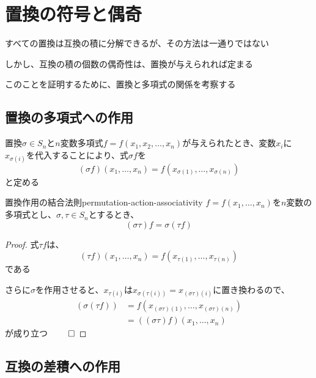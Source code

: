 \documentclass[../../../topic_linear-algebra]{subfiles}
\begin{document}
\sectionline
\section{置換の符号と偶奇}

すべての置換は互換の積に分解できるが、その方法は一通りではない

しかし、互換の積の個数の偶奇性は、置換が与えられれば定まる

\br

このことを証明するために、置換と多項式の関係を考察する

\subsection{置換の多項式への作用}

置換$\sigma \in S_n$と$n$変数多項式$f = f(x_1, x_2, \ldots, x_n)$が与えられたとき、変数$x_i$に$x_{\sigma(i)}$を代入することにより、式$\sigma f$を
\begin{equation*}
  (\sigma f)(x_1, \ldots, x_n) = f(x_{\sigma(1)}, \ldots, x_{\sigma(n)})
\end{equation*}
と定める

\begin{theorem}{置換作用の結合法則}{permutation-action-associativity}
  $f = f(x_1,\ldots,x_n)$を$n$変数の多項式とし、$\sigma, \tau \in S_n$とするとき、
  \begin{equation*}
    (\sigma \tau) f = \sigma (\tau f)
  \end{equation*}
\end{theorem}

\begin{proof}
  式$\tau f$は、
  \begin{equation*}
    (\tau f)(x_1, \ldots, x_n) = f(x_{\tau(1)}, \ldots, x_{\tau(n)})
  \end{equation*}
  である

  さらに$\sigma$を作用させると、$x_{\tau(i)}$は$x_{\sigma(\tau(i))} = x_{(\sigma\tau)(i)}$に置き換わるので、
  \begin{align*}
    (\sigma(\tau f)) & = f(x_{(\sigma\tau)(1)}, \ldots, x_{(\sigma\tau)(n)}) \\
                     & = ((\sigma\tau) f)(x_1, \ldots, x_n)
  \end{align*}
  が成り立つ $\qed$
\end{proof}

\subsection{互換の差積への作用}
\end{document}
